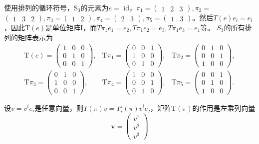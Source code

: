 \documentclass[hyperref,UTF8]{ctexbook}
\begin{document}
使用排列的循环符号，$\mathrm{S}_3$的元素为$e=$ id，$\pi_1=\begin{pmatrix}1 & 2 & 3\end{pmatrix}, \pi_2=$ $\begin{pmatrix}1 & 3 & 2\end{pmatrix}, \pi_3=\begin{pmatrix}1 & 2\end{pmatrix}, \pi_4=\begin{pmatrix}2 & 3\end{pmatrix}, \pi_5=\begin{pmatrix}1 & 3\end{pmatrix}$。然后$T(e) e_i=e_i$，因此$\mathrm{T}(e)$是单位矩阵I，而$T\pi_1 e_1=e_2, T\pi_1 e_2=e_3, T\pi_1 e_3=e_1$等。 $S_3$的所有排列的矩阵表示为
$$
\begin{array}{ccc}
\mathrm{T}(e)=\begin{pmatrix}
1 & 0 & 0 \\
0 & 1 & 0 \\
0 & 0 & 1
\end{pmatrix}, & \mathrm{T}\pi_1=\begin{pmatrix}
0 & 0 & 1 \\
1 & 0 & 0 \\
0 & 1 & 0
\end{pmatrix}, & \mathrm{T}\pi_2=\begin{pmatrix}
0 & 1 & 0 \\
0 & 0 & 1 \\
1 & 0 & 0
\end{pmatrix}, \\
\mathrm{T}\pi_3=\begin{pmatrix}
0 & 1 & 0 \\
1 & 0 & 0 \\
0 & 0 & 1
\end{pmatrix}, & \mathrm{T}\pi_4=\begin{pmatrix}
1 & 0 & 0 \\
0 & 0 & 1 \\
0 & 1 & 0
\end{pmatrix}, & \mathrm{T}\pi_5=\begin{pmatrix}
0 & 0 & 1 \\
0 & 1 & 0 \\
1 & 0 & 0
\end{pmatrix} .
\end{array}
$$

设$v=v^i e_i$是任意向量，则$T(\pi) v=T_i^j(\pi) v^i e_j$，矩阵$\mathrm{T}(\pi)$的作用是左乘列向量
$$
\mathbf{v}=\begin{pmatrix}
v^1 \\
v^2 \\
v^3
\end{pmatrix}$$
\end{document}
